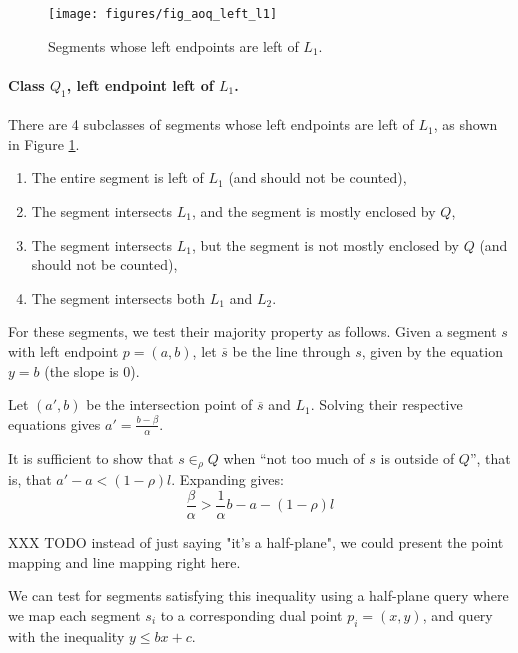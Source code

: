 \begin{figure}[t]
\begin{center}
  \texttt{[image: figures/fig\_aoq\_left\_l1]}
  \caption{Segments whose left endpoints are left of $L_1$.}
  \label{fig:slabs:one:aoq_left_l1}
\end{center}
\end{figure}

\paragraph{Class $Q_1$, left endpoint left of $L_1$.} There are 4 subclasses of segments whose left endpoints are left of $L_1$, as shown in Figure \ref{fig:slabs:one:aoq_left_l1}.

\begin{enumerate}
 \item The entire segment is left of $L_1$ (and should not be counted),

 \item The segment intersects $L_1$, and the segment is mostly enclosed by $Q$,

 \item The segment intersects $L_1$, but the segment is not mostly enclosed by $Q$ (and should not be counted),

 \item The segment intersects both $L_1$ and $L_2$. 

\end{enumerate}

For these segments, we test their majority property as follows. Given a segment $s$ with left endpoint $p = (a,b)$, let $\overline{s}$ be the line through $s$, given by the equation $y = b$ (the slope is 0).

Let $(a', b)$ be the intersection point of $\overline{s}$ and $L_1$. Solving their respective equations gives $a' = \frac{b - \beta}{\alpha}$.

It is sufficient to show that $s \in_\rho Q$ when ``not too much of $s$ is outside of $Q$'', that is, that $a' - a < (1 - \rho)l$. Expanding gives:
\[
\frac{\beta}{\alpha} > \frac{1}{\alpha} b - a - (1 - \rho)l 
\]

\noindent
XXX TODO instead of just saying "it's a half-plane", we could present the point mapping and line mapping right here.

We can test for segments satisfying this inequality using a half-plane query where we map each segment $s_i$ to a corresponding dual point $p_i = (x,y)$, and query with the inequality $y \leq bx + c$.

